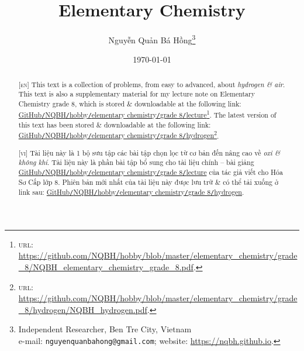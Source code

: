 \documentclass{article}
\title{Elementary Chemistry}
\author{Nguyễn Quản Bá Hồng\footnote{Independent Researcher, Ben Tre City, Vietnam\\e-mail: \texttt{nguyenquanbahong@gmail.com}; website: \url{https://nqbh.github.io}.}}
\date{\today}
\begin{document}
\maketitle
\begin{abstract}
	\textsc{[en]} This text is a collection of problems, from easy to advanced, about \textit{hydrogen \& air}. This text is also a supplementary material for my lecture note on Elementary Chemistry grade 8, which is stored \& downloadable at the following link: \href{https://github.com/NQBH/hobby/blob/master/elementary_chemistry/grade_8/NQBH_elementary_chemistry_grade_8.pdf}{GitHub\texttt{/}NQBH\texttt{/}hobby\texttt{/}elementary chemistry\texttt{/}grade 8\texttt{/}lecture}\footnote{\textsc{url}: \url{https://github.com/NQBH/hobby/blob/master/elementary_chemistry/grade_8/NQBH_elementary_chemistry_grade_8.pdf}.}. The latest version of this text has been stored \& downloadable at the following link: \href{https://github.com/NQBH/hobby/blob/master/elementary_chemistry/grade_8/hydrogen/NQBH_hydrogen.pdf}{GitHub\texttt{/}NQBH\texttt{/}hobby\texttt{/}elementary chemistry\texttt{/}grade 8\texttt{/}hydrogen}\footnote{\textsc{url}: \url{https://github.com/NQBH/hobby/blob/master/elementary_chemistry/grade_8/hydrogen/NQBH_hydrogen.pdf}.}.
	\vspace{2mm}
	
	\textsc{[vi]} Tài liệu này là 1 bộ sưu tập các bài tập chọn lọc từ cơ bản đến nâng cao về \textit{oxi \& không khí}. Tài liệu này là phần bài tập bổ sung cho tài liệu chính -- bài giảng \href{https://github.com/NQBH/hobby/blob/master/elementary_chemistry/grade_8/NQBH_elementary_chemistry_grade_8.pdf}{GitHub\texttt{/}NQBH\texttt{/}hobby\texttt{/}elementary chemistry\texttt{/}grade 8\texttt{/}lecture} của tác giả viết cho Hóa Sơ Cấp lớp 8. Phiên bản mới nhất của tài liệu này được lưu trữ \& có thể tải xuống ở link sau: \href{https://github.com/NQBH/hobby/blob/master/elementary_chemistry/grade_8/hydrogen/NQBH_hydrogen.pdf}{GitHub\texttt{/}NQBH\texttt{/}hobby\texttt{/}elementary chemistry\texttt{/}grade 8\texttt{/}hydrogen}.
\end{abstract}
\tableofcontents
\newpage

\end{document}
